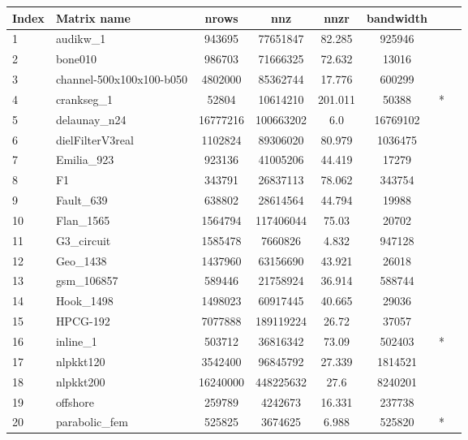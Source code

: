 	\begin{tabular}{|l|l|c|c|c|c|c|c|}
		\toprule
		{Index} & {Matrix name} & {nrows} & {nnz} & {nnzr} & {bandwidth} &  {} &  \\
		\midrule
{1}	& {audikw\_1}	& {943695}	& {77651847}	& {82.285}	& {925946}	& {} &	\multirow{24}{*}{\rotatebox[origin=c]{90}{SuiteSparse Matrix Collection}} \\
{2}	& {bone010}	& {986703}	& {71666325}	& {72.632}	& {13016}	& {} &	\\
{3}	& {channel-500x100x100-b050}	& {4802000}	& {85362744}	& {17.776}	& {600299}	& {} &	\\
{4}	& {crankseg\_1}	& {52804}	& {10614210}	& {201.011}	& {50388}	& {*} &	\\
{5}	& {delaunay\_n24}	& {16777216}	& {100663202}	& {6.0}	& {16769102}	& {} &	\\
{6}	& {dielFilterV3real}	& {1102824}	& {89306020}	& {80.979}	& {1036475}	& {} &	\\
{7}	& {Emilia\_923}	& {923136}	& {41005206}	& {44.419}	& {17279}	& {} &	\\
{8}	& {F1}	& {343791}	& {26837113}	& {78.062}	& {343754}	& {} &	\\
{9}	& {Fault\_639}	& {638802}	& {28614564}	& {44.794}	& {19988}	& {} &	\\
{10}	& {Flan\_1565}	& {1564794}	& {117406044}	& {75.03}	& {20702}	& {} &	\\
{11}	& {G3\_circuit}	& {1585478}	& {7660826}	& {4.832}	& {947128}	& {} &	\\
{12}	& {Geo\_1438}	& {1437960}	& {63156690}	& {43.921}	& {26018}	& {} &	\\
{13}	& {gsm\_106857}	& {589446}	& {21758924}	& {36.914}	& {588744}	& {} &	\\
{14}	& {Hook\_1498}	& {1498023}	& {60917445}	& {40.665}	& {29036}	& {} &	\\
{15}	& {HPCG-192}	& {7077888}	& {189119224}	& {26.72}	& {37057}	& {} &	\\
{16}	& {inline\_1}	& {503712}	& {36816342}	& {73.09}	& {502403}	& {*} &	\\
{17}	& {nlpkkt120}	& {3542400}	& {96845792}	& {27.339}	& {1814521}	& {} &	\\
{18}	& {nlpkkt200}	& {16240000}	& {448225632}	& {27.6}	& {8240201}	& {} &	\\
{19}	& {offshore}	& {259789}	& {4242673}	& {16.331}	& {237738}	& {} &	\\
{20}	& {parabolic\_fem}	& {525825}	& {3674625}	& {6.988}	& {525820}	& {*} &	\\

\end{tabular}
